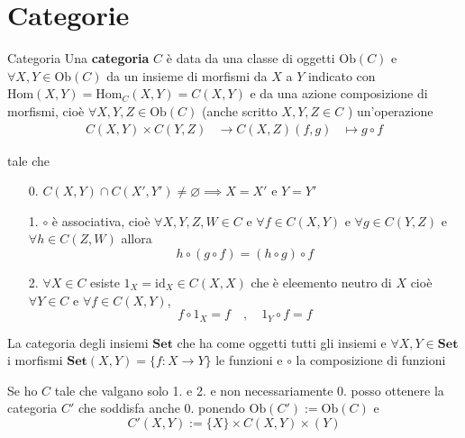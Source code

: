\chapter{Categorie}

\begin{definition}{Categoria}
    Una \textbf{categoria} \(C\) è data da una classe di oggetti \(\mathrm{Ob}{(C)}\) e \(\forall X, Y \in \mathrm{Ob}{(C)}\) da un insieme di morfismi da \(X \) a \(Y\) indicato con
    \(\mathrm{Hom}{(X,Y)} = \mathrm{Hom}_C {(X, Y)} = C{(X, Y)}\)  e da una
   azione  composizione di morfismi, cioè \(\forall X, Y, Z \in \mathrm{Ob}{(C)}\)
    (anche scritto \(X, Y, Z \in C\) ) un'operazione 
    \begin{align*}
        C{(X, Y)} \times  C{(Y, Z)} &\to  C{(X, Z)}
        {(f, g)} &\mapsto g \circ f
    \end{align*}

    tale che 
\begin{enumerate}[label = \arabic*.]
    \item[0.] \(C{(X,Y)} \cap  C{(X', Y')} \neq \varnothing \implies X = X' \text{ e } Y = Y'\) 
    \item[1.] \(\circ\) è associativa, cioè \(\forall X, Y, Z, W \in C\) e \(\forall f \in C{(X,Y)}\) e \(\forall g \in C{(Y, Z)}\) e \(\forall h \in C{(Z, W)}\)  allora 
        \[
          h \circ {(g \circ f)} = {(h \circ g)} \circ f
        \]
    \item[2.] \(\forall  X \in  C \) esiste \(1_X = \mathrm{id}_X \in C{(X, X)}\)
        che è eleemento neutro di \(X\) cioè \(\forall Y \in C\) e \(\forall f
        \in C{(X, Y)}\), 
        \[
          f \circ 1_X = f \quad, \quad 1_Y \circ f = f
        \]
\end{enumerate}
\end{definition}
\begin{example}{}
    La categoria degli insiemi \(\mathbf{Set} \) che ha come oggetti tutti gli
    insiemi e \(\forall X, Y \in \mathbf{Set} \) i morfismi \(\mathbf{Set}{(X, Y)} = \{f : X \to Y\}  \) le funzioni e \(\circ\) la composizione di funzioni
\end{example}
\begin{remark}{}
    Se ho \(C\) tale che valgano solo 1. e 2. e non necessariamente 0. posso
    ottenere la categoria \(C'\) che soddisfa anche 0. ponendo \(\mathrm{Ob}{(C')} := \mathrm{Ob}{(C)}\) e 
    \[
      C'{(X, Y)} := \{X\} \times C{(X,Y)} \times {(Y)}
    \]
\end{remark}
